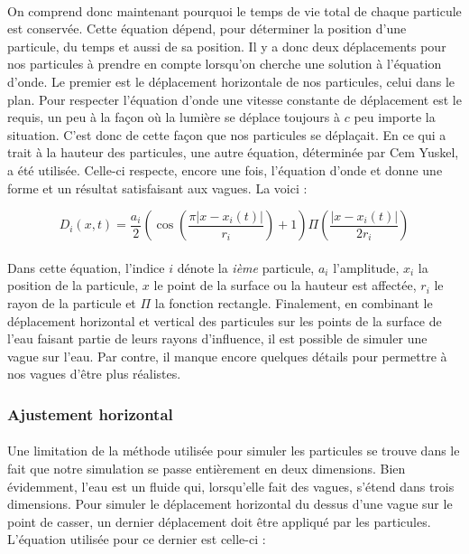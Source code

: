\documentclass[a4paper, 12pt]{article} %
\begin{document}
	\paragraph{}
	On comprend donc maintenant pourquoi le temps de vie total de chaque particule est conservée.
	Cette équation dépend, pour déterminer la position d'une particule, du temps et aussi de sa position.
	Il y a donc deux déplacements pour nos particules à prendre en compte lorsqu'on cherche une solution à
	l'équation d'onde. Le premier est le déplacement horizontale de nos particules, celui dans le plan.
	Pour respecter l'équation d'onde une vitesse constante de déplacement est le requis, un peu à la façon
	où la lumière se déplace toujours à $c$ peu importe la situation. C'est donc de cette façon que nos particules
	se déplaçait. En ce qui a trait à la hauteur des particules, une autre équation, déterminée par Cem Yuskel,
	a été utilisée. Celle-ci respecte, encore une fois, l'équation d'onde et donne une forme et un résultat satisfaisant
	aux vagues. La voici :

	\begin{equation}
	    D_{i}(x, t) = \frac{a_{i}}{2} \left( \cos\left( \frac{\pi |x - x_{i}(t)|}{r_{i}}\right) + 1\right)
	    \Pi \left( \frac{|x - x_{i}(t)|} {2 r_{i}}\right)
	\end{equation}

	\paragraph{}
	Dans cette équation, l'indice $i$ dénote la \textit{ième} particule, $a_{i}$ l'amplitude, $x_{i}$ la position de la particule,
	$x$ le point de la surface ou la hauteur est affectée,
	$r_{i}$ le rayon de la particule et $\Pi$ la fonction rectangle. Finalement, en combinant le déplacement horizontal et vertical des particules sur 
	les points de la surface de l'eau faisant partie de leurs rayons d'influence, il est possible de simuler une vague sur l'eau.
	Par contre, il manque encore quelques détails pour permettre à nos vagues d'être plus réalistes.

	\subsubsection{Ajustement horizontal}
	    \paragraph{}
	    Une limitation de la méthode utilisée pour simuler les particules se trouve dans le fait que notre simulation se passe 
	    entièrement en deux dimensions. Bien évidemment, l'eau est un fluide qui, lorsqu'elle fait des vagues, s'étend dans trois dimensions.
	    Pour simuler le déplacement horizontal du dessus d'une vague sur le point de casser, un dernier déplacement doit être appliqué
	    par les particules. L'équation utilisée pour ce dernier est celle-ci :
\end{document}

